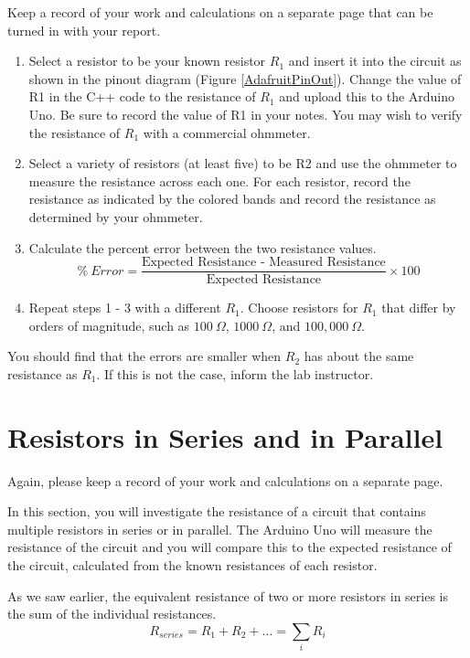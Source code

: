 \documentclass[]{article}
\begin{document}
	Keep a record of your work and calculations on a separate page that can be turned in with your report.
	\begin{enumerate}
		\item Select a resistor to be your known resistor $R_1$ and insert it into the circuit as shown in the pinout diagram (Figure \ref{AdafruitPinOut}).  Change the value of R1 in the C++ code to the resistance of $R_1$ and upload this to the Arduino Uno.  Be sure to record the value of R1 in your notes.  You may wish to verify the resistance of $R_1$ with a commercial ohmmeter.
		\item Select a variety of resistors  (at least five) to be R2 and use the ohmmeter to measure the resistance across each one.  For each resistor, record the resistance as indicated by the colored bands and record the resistance as determined by your ohmmeter.
		\item Calculate the percent error between the two resistance values.
		\begin{equation}
			\% \ Error = \frac{\text{Expected Resistance - Measured Resistance}}{\text{Expected  Resistance}} \times 100
		\end{equation}
		\item Repeat steps 1 - 3 with a different $R_1$.  Choose resistors for $R_1$ that differ by  orders of magnitude, such as $100\ \Omega$, $1000\ \Omega$, and $100,000\ \Omega$.
	\end{enumerate}

	You should find that the errors are smaller when $R_2$ has about the same resistance as $R_1$.  If this is not the case, inform the lab instructor.
	\newpage
	\section{Resistors in Series and in Parallel}
	Again, please keep a record of your work and calculations on a separate page.

	In this section, you will investigate the resistance of a circuit that contains multiple resistors in series or in parallel.  The Arduino Uno will measure the resistance of the circuit and you will compare this to the expected resistance of the circuit, calculated from the known resistances of each resistor.

	As we saw earlier, the equivalent resistance of two or more resistors in series is the sum of the individual resistances.
	\begin{equation}
		R_{series} = R_1 + R_2 +\dots = \sum_i R_i
	\end{equation}
	
\end{document}
